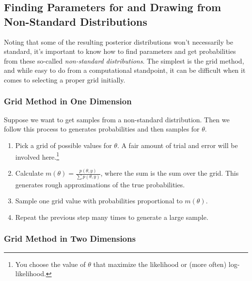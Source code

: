 \documentclass[12pt]{article}
\theoremstyle{plain}
\theoremstyle{definition}
\theoremstyle{remark}
\begin{document}
\newpage
\subsection{Finding Parameters for and
Drawing from Non-Standard Distributions}

Noting that some of the resulting posterior distributions won't
necessarily be standard, it's important to know how to find parameters
and get probabilities
from these so-called \emph{non-standard distributions}. The simplest
is the grid method, and while easy to do from a computational
standpoint,
it can be difficult when it comes to selecting a proper grid
initially.

\subsubsection{Grid Method in One Dimension}

Suppose we want to get samples from a non-standard distribution. Then
we follow this process to generates probabilities and then samples for
$\theta$.
\begin{enumerate}
   \item Pick a grid of possible values for $\theta$. A fair amount
      of trial and error will be involved here.\footnote{You choose
      the value of $\theta$ that maximize the likelihood or
      (more often) log-likelihood.}
   \item Calculate $m(\theta) = \frac{p(\theta, y)}{\sum p(\theta, y)}$,
      where the sum is the sum over the grid. This generates rough
      approximations of the true probabilities.
   \item Sample one grid value with probabilities proportional to
      $m(\theta)$.
   \item Repeat the previous step many times to generate a large sample.
\end{enumerate}

\subsubsection{Grid Method in Two Dimensions}
\end{document}

